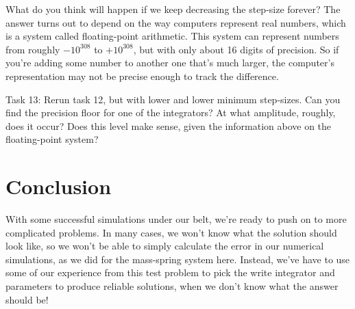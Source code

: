 \documentclass[main.tex]{subfiles}
\begin{document}
What do you think will happen if we keep decreasing the step-size forever?
The answer turns out to depend on the way computers represent real numbers, which is a system called floating-point arithmetic.
This system can represent numbers from roughly $-10^{308}$ to $+10^{308}$, but with only about 16 digits of precision.
So if you're adding some number to another one that's much larger, the computer's representation may not be precise enough to track the difference.

Task 13:
Rerun task 12, but with lower and lower minimum step-sizes.  
Can you find the precision floor for one of the integrators?  
At what amplitude, roughly, does it occur?  
Does this level make sense, given the information above on the floating-point system?

\section{Conclusion}

With some successful simulations under our belt, we're ready to push on to more complicated problems.  
In many cases, we won't know what the solution should look like, so we won't be able to simply calculate the error in our numerical simulations, as we did for the mass-spring system here.  
Instead, we've have to use some of our experience from this test problem to pick the write integrator and parameters to produce reliable solutions, when we don't know what the answer should be!
\end{document}
